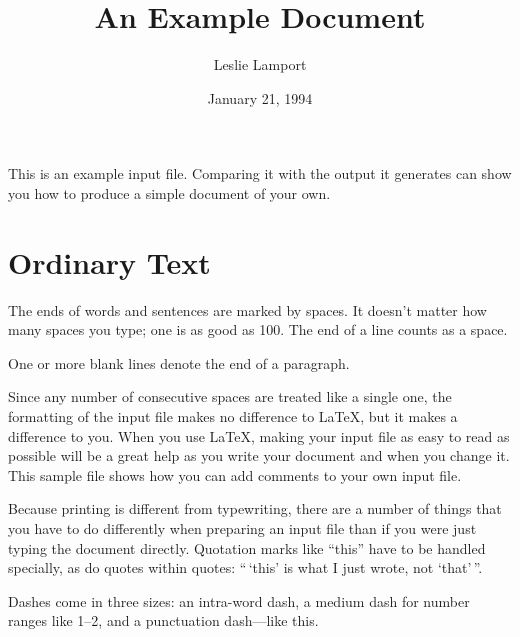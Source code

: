 \documentclass{article}      %
\title{An Example Document}  %
\author{Leslie Lamport}      %
\date{January 21, 1994}      %
\begin{document}

\maketitle                   %

This is an example input file.  Comparing it with
the output it generates can show you how to
produce a simple document of your own.

\section{Ordinary Text}      %

The ends  of words and sentences are marked
  by   spaces. It  doesn't matter how many
spaces    you type; one is as good as 100.  The
end of   a line counts as a space.

One   or more   blank lines denote the  end
of  a paragraph.

Since any number of consecutive spaces are treated
like a single one, the formatting of the input
file makes no difference to
      \LaTeX,                %
but it makes a difference to you.  When you use
\LaTeX, making your input file as easy to read
as possible will be a great help as you write
your document and when you change it.  This sample
file shows how you can add comments to your own input
file.

Because printing is different from typewriting,
there are a number of things that you have to do
differently when preparing an input file than if
you were just typing the document directly.
Quotation marks like
       ``this''
have to be handled specially, as do quotes within
quotes:
       ``\,`this'            %
        is what I just
        wrote, not  `that'\,''.

Dashes come in three sizes: an
       intra-word
dash, a medium dash for number ranges like
       1--2,
and a punctuation
       dash---like
this.
\end{document}
